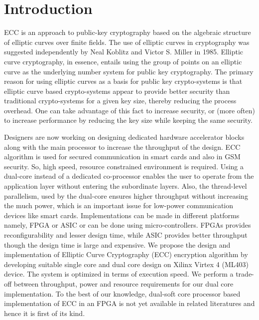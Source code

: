 \documentclass[preprint,12pt]{elsarticle}
\begin{document}
\section{Introduction}
\label{section:introduction}
ECC is an approach to public-key cryptography based on the algebraic structure of elliptic curves over finite fields. The use of elliptic curves in cryptography was suggested independently by Neal Koblitz\cite{koblitz}  and Victor S. Miller\cite{miller} in 1985. Elliptic curve cryptography, in essence, entails using the group of points on an elliptic curve as the underlying number system for public key cryptography. The primary reason for using elliptic curves as a basis for public key crypto-systems is that elliptic curve based crypto-systems appear to provide better security than traditional crypto-systems for a given key size\cite{acm}, thereby reducing the process overhead. One can take advantage of this fact to increase security, or (more often) to increase performance by reducing the key size while keeping the same security.

Designers are now working on designing dedicated hardware accelerator blocks along with the main processor \cite{coprocessor}\cite{hardware}\cite{multi} to increase the throughput of the design. ECC algorithm is used for secured communication in smart cards\cite{scard} and also in GSM security\cite{gsm}. So, high speed, resource constrained  environment is required. Using a dual-core instead of a dedicated co-processor enables the user to operate from the application layer without entering the subordinate layers. Also, the thread-level parallelism, used by the dual-core ensures higher throughput without increasing the much power, which is an important issue for low-power communication devices like smart cards.  Implementations can be made in different platforms namely, FPGA or ASIC or can be done using micro-controllers. FPGAs provides reconfigurability and lesser design time, while ASIC provides better throughput though the design time is large and expensive. We propose the design and implementation of Elliptic Curve Cryptography (ECC) encryption algorithm by developing suitable single core and dual core design on Xilinx Virtex 4 (ML403) device. The system is optimized in terms of execution speed. We perform a trade-off between throughput, power and resource requirements for our dual core implementation. To the best of our knowledge, dual-soft core processor based implementation of ECC in an FPGA  is not yet available in related literatures and hence it is first of its kind.
\end{document}
